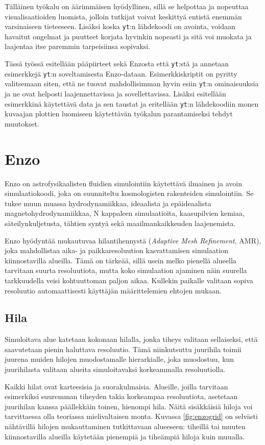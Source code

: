 \documentclass[12pt,a4paper]{article}
\newcommand{\yt}{\texttt{yt}}
\begin{document}
Tälläinen työkalu on äärimmäisen hyödyllinen, sillä se helpottaa ja nopeuttaa visualisaatioiden luomista, jolloin tutkijat voivat keskittyä entistä enemmän varsinaiseen tieteeseen. Lisäksi koska \yt :n lähdekoodi on avointa, voidaan havaitut ongelmat ja puutteet korjata hyvinkin nopeasti ja sitä voi muokata ja laajentaa itse paremmin tarpeisiinsa sopivaksi.

Tässä työssä esitellään pääpiirteet sekä Enzosta että \yt :stä ja annetaan esimerkkejä \yt :n soveltamisesta Enzo-dataan. Esimerkkiskriptit on pyritty valitsemaan siten, että ne tuovat mahdollisimman hyvin esiin \yt :n ominaisuuksia ja ne ovat helposti laajennettavissa ja sovellettavissa. Lisäksi esitellään esimerkkinä käytettävä data ja sen taustat ja eritellään \yt :n lähdekoodiin monen kuvaajan plottien luomiseen käytettävän työkalun parantamiseksi tehdyt muutokset.

\section{Enzo}
Enzo on astrofysikaalisten fluidien simulointiin käytettävä ilmainen ja avoin simulaatiokoodi, joka on suunniteltu kosmologisten rakenteiden simulointiin. Se tukee muun muassa hydrodynamiikkaa, ideaalista ja epäideaalista magnetohydrodynamiikkaa, N kappaleen simulaatioita, kaasupilvien kemiaa, säteilynkuljetusta, tähtien syntyä sekä maailmankaikkeuden laajenemista. \cite{enzo}

Enzo hyödyntää mukautuvaa hilantihennystä (\textit{Adaptive Mesh Refinement}, AMR), joka mahdollistaa aika- ja paikkaresoluution kasvattamisen simulaation kiinnostavilla alueilla. Tämä on tärkeää, sillä usein melko pienellä alueella tarvitaan suurta resoluutiota, mutta koko simulaation ajaminen näin suurella tarkkuudella veisi kohtuuttoman paljon aikaa. Kullekin paikalle valitaan sopiva resoluutio automaattisesti käyttäjän määrittelemien ehtojen mukaan. \cite{enzo}

\subsection{Hila}
Simuloitava alue katetaan kokonaan hilalla, jonka tiheys valitaan sellaiseksi, että saavutetaan pienin haluttava resoluutio. Tämä niinkutsuttu juurihila toimii juurena muiden hilojen muodostamalle hierarkialle, joka muodostuu, kun juurihilasta valitaan alueita simuloitavaksi korkeammalla resoluutiolla.\cite{enzo}
	
Kaikki hilat ovat karteesisia ja suorakulmaisia. Alueille, joilla tarvitaan esimerkiksi suuremman tiheyden takia korkeampaa resoluutiota, asetetaan juurihilan kanssa päällekkäin toinen, hienompi hila. Näitä sisäkkäisiä hiloja voi tarvittaessa olla teoriassa mielivaltaisen monta. Kuvassa \ref{fig:enzogrid} on selvästi nähtävillä hilojen mukauttaminen tutkittavaan alueeseen: tiheillä tai muuten kiinnostavilla alueilla käytetään pienempiä ja tiheämpiä hiloja kuin muualla. \cite{enzo} %
\end{document}
